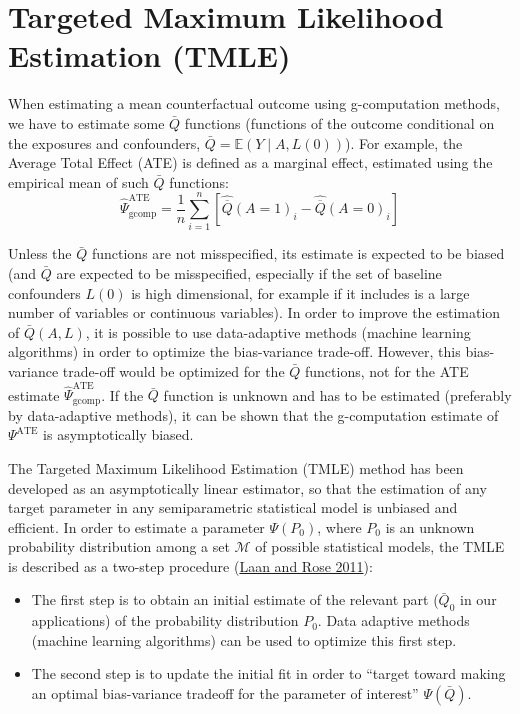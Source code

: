 \documentclass[
]{book}
\providecommand{\tightlist}{%
  \setlength{\itemsep}{0pt}\setlength{\parskip}{0pt}}
\begin{document}
\hypertarget{chap_tmle}{%
\chapter{Targeted Maximum Likelihood Estimation (TMLE)}\label{chap_tmle}}

When estimating a mean counterfactual outcome using g-computation methods, we have to estimate some \(\bar{Q}\) functions (functions of the outcome conditional on the exposures and confounders, \(\bar{Q}=\mathbb{E}\left(Y\mid A,L(0)\right)\)). For example, the Average Total Effect (ATE) is defined as a marginal effect, estimated using the empirical mean of such \(\bar{Q}\) functions:
\begin{equation*}
\hat{\Psi}^{\text{ATE}}_{\text{gcomp}} = \frac{1}{n} \sum_{i=1}^n \left[ \hat{\overline{Q}}(A=1)_i - \hat{\overline{Q}}(A=0)_i \right]
\end{equation*}

Unless the \(\bar{Q}\) functions are not misspecified, its estimate is expected to be biased (and \(\bar{Q}\) are expected to be misspecified, especially if the set of baseline confounders \(L(0)\) is high dimensional, for example if it includes is a large number of variables or continuous variables). In order to improve the estimation of \(\bar{Q}(A,L)\), it is possible to use data-adaptive methods (machine learning algorithms) in order to optimize the bias-variance trade-off. However, this bias-variance trade-off would be optimized for the \(\bar{Q}\) functions, not for the ATE estimate \(\hat{\Psi}^\text{ATE}_\text{gcomp}\). If the \(\bar{Q}\) function is unknown and has to be estimated (preferably by data-adaptive methods), it can be shown that the g-computation estimate of \(\Psi^\text{ATE}\) is asymptotically biased.

The Targeted Maximum Likelihood Estimation (TMLE) method has been developed as an asymptotically linear estimator, so that the estimation of any target parameter in any semiparametric statistical model is unbiased and efficient. In order to estimate a parameter \(\Psi(P_0)\), where \(P_0\) is an unknown probability distribution among a set \(\mathcal{M}\) of possible statistical models, the TMLE is described as a two-step procedure (\protect\hyperlink{ref-vanderlaan_book2011}{Laan and Rose 2011}):

\begin{itemize}
\tightlist
\item
  The first step is to obtain an initial estimate of the relevant part (\(\bar{Q}_0\) in our applications) of the probability distribution \(P_0\). Data adaptive methods (machine learning algorithms) can be used to optimize this first step.
\item
  The second step is to update the initial fit in order to ``target toward making an optimal bias-variance tradeoff for the parameter of interest'' \(\Psi(\bar{Q})\).
\end{itemize}
\end{document}
